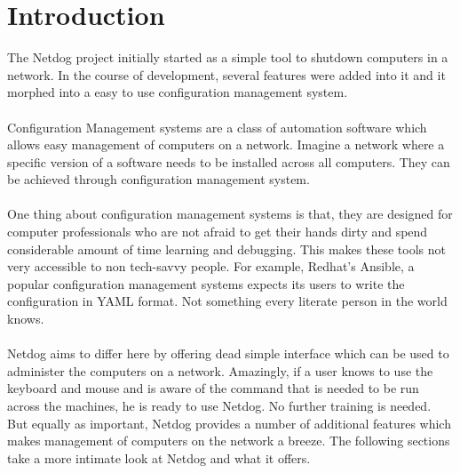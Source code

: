 \chapter{Introduction}

The Netdog project initially started as a simple tool to shutdown computers in a
network. In the course of development, several features were added into it and
it morphed into a easy to use configuration management system.
\\\\
Configuration Management systems are a class of automation software which allows
easy management of computers on a network. Imagine a network where a specific
version of a software needs to be installed across all computers. They can be
achieved through configuration management system.
\\\\
One thing about configuration management systems is that, they are designed for
computer professionals who are not afraid to get their hands dirty and spend
considerable amount of time learning and debugging. This makes these tools not
very accessible to non tech-savvy people. For example, Redhat's Ansible, a
popular configuration management systems expects its users to write the
configuration in YAML format. Not something every literate person in the world
knows.
\\\\
Netdog aims to differ here by offering dead simple interface which can be used
to administer the computers on a network. Amazingly, if a user knows to use the
keyboard and mouse and is aware of the command that is needed to be run across
the machines, he is ready to use Netdog. No further training is needed. But
equally as important, Netdog provides a number of additional features which
makes management of computers on the network a breeze. The following sections
take a more intimate look at Netdog and what it offers.


\newpage 

